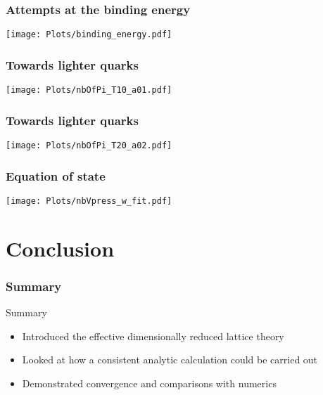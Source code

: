 \documentclass[12pt,a4paper,dvipsnames,usenames]{beamer}
\begin{document}
\begin{frame}
  \frametitle{Attempts at the binding energy}

  {\centering
    \texttt{[image: Plots/binding\_energy.pdf]}
  \par}


\end{frame}

\begin{frame}
  \frametitle{Towards lighter quarks}

  {\centering
    \texttt{[image: Plots/nbOfPi\_T10\_a01.pdf]}
  \par}
  
\end{frame}

\begin{frame}
  \frametitle{Towards lighter quarks}

  {\centering
    \texttt{[image: Plots/nbOfPi\_T20\_a02.pdf]}
  \par}
  
\end{frame}

\begin{frame}
  \frametitle{Equation of state}

  {\centering
    \texttt{[image: Plots/nbVpress\_w\_fit.pdf]}
  \par}
  
\end{frame}

\section{Conclusion}
\sectionframe

\begin{frame}
  \frametitle{Summary}

  {\color{LightUIRed} Summary}

  \vspace{.2cm}
  \begin{itemize}
    \setlength\itemsep{1em}
    \item Introduced the effective dimensionally reduced lattice theory
    \item Looked at how a consistent analytic calculation could be carried out
    \item Demonstrated convergence and comparisons with numerics
  \end{itemize}
  
\end{frame}
\end{document}
